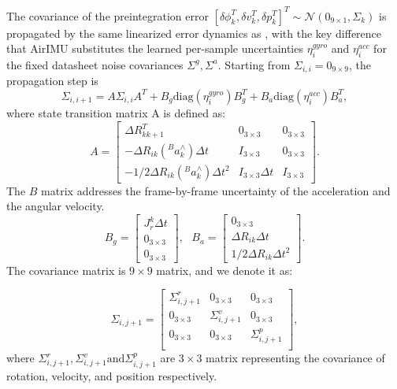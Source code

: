 The covariance of the preintegration error $[\delta \phi_{k}^T, \delta v_{k}^T, \delta p_{k}^T]^T \sim \mathcal{N}(0_{9 \times 1}, \Sigma_{k})$ is propagated by the same linearized error dynamics as , with the key difference that AirIMU substitutes the learned per-sample uncertainties $\eta^{gyro}_i$ and $\eta^{acc}_i$ for the fixed datasheet noise covariances $\Sigma^g, \Sigma^a$.
Starting from $\Sigma_{i,i} = 0_{9 \times 9}$, the propagation step is
    \begin{equation}
    \label{formula: 4.cov}
        \Sigma_{i,i+1} 
          = A \Sigma_{i,i} A^T + B_g \mathrm{diag}(\eta^{gyro}_i) B_g^T + B_a \mathrm{diag}(\eta^{acc}_i) B_a^T,
    \end{equation}
where state transition matrix A is defined as:
             \begin{equation}A =
            \begin{bmatrix}
                  {\Delta}R_{kk+1}^T & 0_{3 \times 3}  & 0_{3 \times 3} \\
                  -{\Delta}R_{ik} ({}^Ba_k^{\wedge}) {\Delta}t & I_{3 \times 3} & 0_{3 \times 3} \\
                  -1/2{\Delta}R_{ik} ({}^Ba_k^{\wedge}) {\Delta}t^2 & I_{3 \times 3} {\Delta}t & I_{3 \times 3}
                  \end{bmatrix}.
                \end{equation}
The $B$ matrix addresses the frame-by-frame uncertainty of the acceleration and the angular velocity. 
\begin{equation}
            B_g = \begin{bmatrix}
                    J_r^k \Delta t  \\
                    0_{3 \times 3}  \\
                    0_{3 \times 3} 
                \end{bmatrix}, \ \ \ 
                B_a = \begin{bmatrix}
                    0_{3 \times 3} \\
                    {\Delta}R_{ik} {\Delta}t  \\
                    1/2 {\Delta}R_{ik} {\Delta}t^2
                \end{bmatrix}.
\end{equation}
The covariance matrix is $9 \times 9$ matrix, and we denote it as:

\begin{equation}
\Sigma_{i,j+1} = 
\begin{bmatrix}
\Sigma^r_{i,j+1} & 0_{3 \times 3} & 0_{3 \times 3}\\
0_{3 \times 3} & \Sigma^v_{i,j+1} & 0_{3 \times 3} \\
0_{3 \times 3} & 0_{3 \times 3} & \Sigma^p_{i,j+1} \\
\end{bmatrix},
\end{equation}
where $\Sigma^r_{i,j+1}, \Sigma^v_{i,j+1} \text{and} \Sigma^p_{i,j+1}$ are $3\times 3$ matrix representing the covariance of rotation, velocity, and position respectively.

